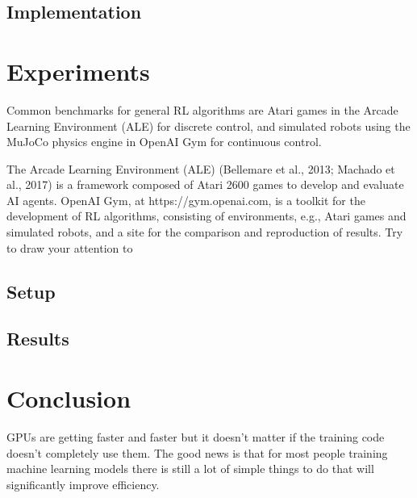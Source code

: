 \documentclass[11 pt, twocolumn]{article}
\begin{document}
\subsection{Implementation}



\section{Experiments}
Common benchmarks for general RL algorithms are Atari games in the Arcade Learning Environment (ALE) for discrete control, and simulated robots using the MuJoCo physics engine in OpenAI
Gym for continuous control.

The Arcade Learning Environment (ALE) (Bellemare et al., 2013; Machado et al., 2017) is a framework composed of Atari 2600 games to develop and evaluate AI agents. OpenAI Gym, at https://gym.openai.com, is a toolkit for the development of RL algorithms, consisting of environments, e.g., Atari games and simulated robots, and a site for the comparison and reproduction of results.
Try to draw your attention to

\subsection{Setup}

\subsection{Results}

\section{Conclusion}
GPUs are getting faster and faster but it doesn’t matter if the training code doesn’t completely use them. The good news is that for most people training machine learning models there is still a lot of simple things to do that will significantly improve efficiency.




\end{document}
